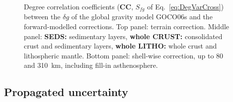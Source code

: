 \begin{figure}
    \begin{adjustbox}{center}
    \end{adjustbox}
    \caption[Temp caption.]{
        Degree correlation coefficients (\textbf{CC}, $S_{fg}$ of Eq.~\ref{eq:DegVarCross}) between the $\delta g$ of the global gravity model {GOCO06s} and the forward-modelled corrections.
        Top panel: terrain correction.
        Middle panel:
        \textbf{{SEDS}:} sedimentary layers,
        \textbf{{whole CRUST}:} consolidated crust and sedimentary layers,
        \textbf{{whole LITHO}:} whole crust and lithospheric mantle.
        Bottom panel: shell-wise correction, up to \num{80} and \SI{310}{\kilo \metre}, including fill-in asthenosphere.
        }
    \label{fig:SigIs:Res:XCorr}
\end{figure}


\FloatBarrier
\subsection{Propagated uncertainty}
\label{ss:SigIs:Results:Uncertainty}

